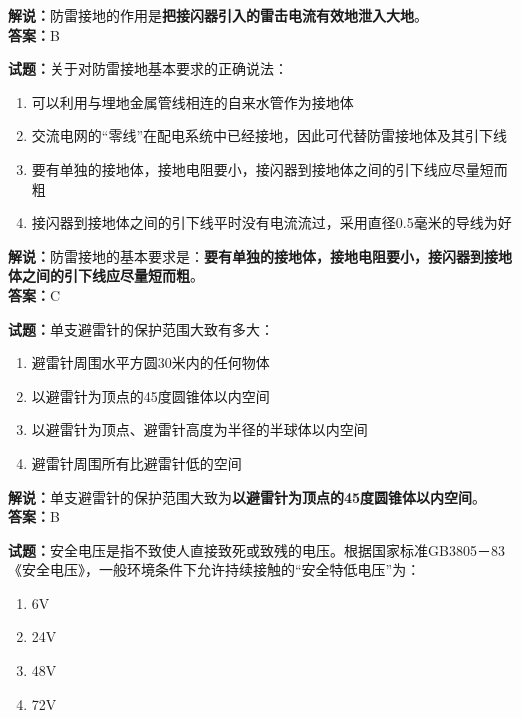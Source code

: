 \documentclass{ctexbook}
\begin{document}
\noindent\textbf{解说：}防雷接地的作用是\textbf{把接闪器引入的雷击电流有效地泄入大地}。\\\noindent\textbf{答案：}B

\bigskip

\noindent\textbf{试题：}关于对防雷接地基本要求的正确说法：

\begin{enumerate}[leftmargin=3em]
  \item 可以利用与埋地金属管线相连的自来水管作为接地体
  \item 交流电网的“零线”在配电系统中已经接地，因此可代替防雷接地体及其引下线
  \item 要有单独的接地体，接地电阻要小，接闪器到接地体之间的引下线应尽量短而粗
  \item 接闪器到接地体之间的引下线平时没有电流流过，采用直径0.5毫米的导线为好
\end{enumerate}

\noindent\textbf{解说：}防雷接地的基本要求是：\textbf{要有单独的接地体，接地电阻要小，接闪器到接地体之间的引下线应尽量短而粗}。\\\noindent\textbf{答案：}C%

\bigskip

\noindent\textbf{试题：}单支避雷针的保护范围大致有多大：

\begin{enumerate}[leftmargin=3em]
  \item 避雷针周围水平方圆30米内的任何物体
  \item 以避雷针为顶点的45度圆锥体以内空间
  \item 以避雷针为顶点、避雷针高度为半径的半球体以内空间
  \item 避雷针周围所有比避雷针低的空间
\end{enumerate}

\noindent\textbf{解说：}单支避雷针的保护范围大致为\textbf{以避雷针为顶点的45度圆锥体以内空间}。\\\noindent\textbf{答案：}B%

\bigskip

\noindent\textbf{试题：}安全电压是指不致使人直接致死或致残的电压。根据国家标准GB3805－83《安全电压》，一般环境条件下允许持续接触的“安全特低电压”为：

\begin{enumerate}[leftmargin=3em]
  \item \num{6}V
  \item \num{24}V
  \item \num{48}V
  \item \num{72}V
\end{enumerate}
\end{document}
